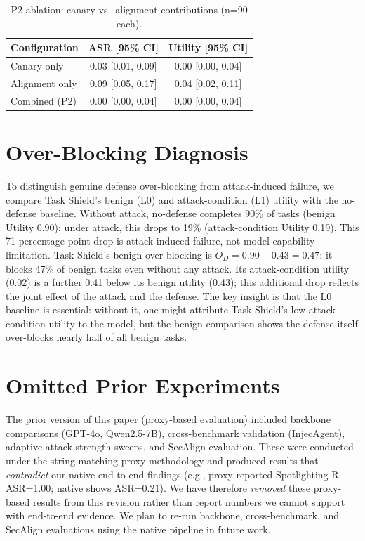 \begin{table}[h]
\centering
\small
\caption{P2 ablation: canary vs.\ alignment contributions (n=90 each).}
\label{tab:p2_ablation_app}
\begin{tabular}{lcc}
\toprule
Configuration & ASR [95\% CI] & Utility [95\% CI] \\
\midrule
Canary only & 0.03 [0.01, 0.09] & 0.00 [0.00, 0.04] \\
Alignment only & 0.09 [0.05, 0.17] & 0.04 [0.02, 0.11] \\
Combined (P2) & 0.00 [0.00, 0.04] & 0.00 [0.00, 0.04] \\
\bottomrule
\end{tabular}
\end{table}

\section{Over-Blocking Diagnosis}
\label{app:overblock}

To distinguish genuine defense over-blocking from attack-induced failure, we compare Task Shield's benign (L0) and attack-condition (L1) utility with the no-defense baseline. Without attack, no-defense completes 90\% of tasks (benign Utility 0.90); under attack, this drops to 19\% (attack-condition Utility 0.19). This 71-percentage-point drop is attack-induced failure, not model capability limitation. Task Shield's benign over-blocking is $O_D = 0.90 - 0.43 = 0.47$: it blocks 47\% of benign tasks even without any attack. Its attack-condition utility (0.02) is a further 0.41 below its benign utility (0.43); this additional drop reflects the joint effect of the attack and the defense. The key insight is that the L0 baseline is essential: without it, one might attribute Task Shield's low attack-condition utility to the model, but the benign comparison shows the defense itself over-blocks nearly half of all benign tasks.

\section{Omitted Prior Experiments}
\label{app:omitted}

The prior version of this paper (proxy-based evaluation) included backbone comparisons (GPT-4o, Qwen2.5-7B), cross-benchmark validation (InjecAgent), adaptive-attack-strength sweeps, and SecAlign evaluation. These were conducted under the string-matching proxy methodology and produced results that \emph{contradict} our native end-to-end findings (e.g., proxy reported Spotlighting R-ASR=1.00; native shows ASR=0.21). We have therefore \emph{removed} these proxy-based results from this revision rather than report numbers we cannot support with end-to-end evidence. We plan to re-run backbone, cross-benchmark, and SecAlign evaluations using the native pipeline in future work.

